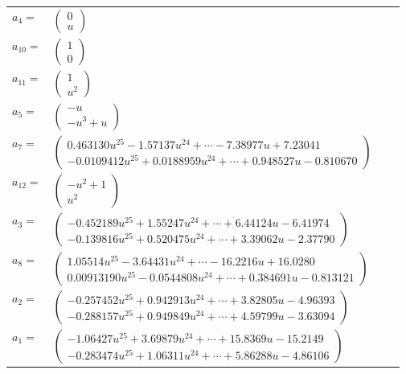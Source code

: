 \documentclass[1p]{elsarticle_modified}
\theoremstyle{definition}
\begin{document}
\begin{tabular}{m{7pt} m{180pt} m{7pt} m{180pt} }
\flushright $a_{4}=$&$\begin{pmatrix}0\\u\end{pmatrix}$ \\
\flushright $a_{10}=$&$\begin{pmatrix}1\\0\end{pmatrix}$ \\
\flushright $a_{11}=$&$\begin{pmatrix}1\\u^2\end{pmatrix}$ \\
\flushright $a_{5}=$&$\begin{pmatrix}- u\\- u^3+u\end{pmatrix}$ \\
\flushright $a_{7}=$&$\begin{pmatrix}0.463130 u^{25}-1.57137 u^{24}+\cdots-7.38977 u+7.23041\\-0.0109412 u^{25}+0.0188959 u^{24}+\cdots+0.948527 u-0.810670\end{pmatrix}$ \\
\flushright $a_{12}=$&$\begin{pmatrix}- u^2+1\\u^2\end{pmatrix}$ \\
\flushright $a_{3}=$&$\begin{pmatrix}-0.452189 u^{25}+1.55247 u^{24}+\cdots+6.44124 u-6.41974\\-0.139816 u^{25}+0.520475 u^{24}+\cdots+3.39062 u-2.37790\end{pmatrix}$ \\
\flushright $a_{8}=$&$\begin{pmatrix}1.05514 u^{25}-3.64431 u^{24}+\cdots-16.2216 u+16.0280\\0.00913190 u^{25}-0.0544808 u^{24}+\cdots+0.384691 u-0.813121\end{pmatrix}$ \\
\flushright $a_{2}=$&$\begin{pmatrix}-0.257452 u^{25}+0.942913 u^{24}+\cdots+3.82805 u-4.96393\\-0.288157 u^{25}+0.949849 u^{24}+\cdots+4.59799 u-3.63094\end{pmatrix}$ \\
\flushright $a_{1}=$&$\begin{pmatrix}-1.06427 u^{25}+3.69879 u^{24}+\cdots+15.8369 u-15.2149\\-0.283474 u^{25}+1.06311 u^{24}+\cdots+5.86288 u-4.86106\end{pmatrix}$ \\

\end{tabular}
\end{document}
